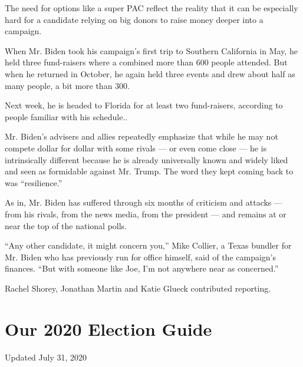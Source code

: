 The need for options like a super PAC reflect the reality that it can be
especially hard for a candidate relying on big donors to raise money
deeper into a campaign.

When Mr. Biden took his campaign's first trip to Southern California in
May, he held three fund-raisers where a combined more than 600 people
attended. But when he returned in October, he again held three events
and drew about half as many people, a bit more than 300.

Next week, he is headed to Florida for at least two fund-raisers,
according to people familiar with his schedule..

Mr. Biden's advisers and allies repeatedly emphasize that while he may
not compete dollar for dollar with some rivals --- or even come close
--- he is intrinsically different because he is already universally
known and widely liked and seen as formidable against Mr. Trump. The
word they kept coming back to was ``resilience.''

As in, Mr. Biden has suffered through six months of criticism and
attacks --- from his rivals, from the news media, from the president ---
and remains at or near the top of the national polls.

``Any other candidate, it might concern you,'' Mike Collier, a Texas
bundler for Mr. Biden who has previously run for office himself, said of
the campaign's finances. ``But with someone like Joe, I'm not anywhere
near as concerned.''

Rachel Shorey, Jonathan Martin and Katie Glueck contributed reporting.

\hypertarget{our-2020-election-guide}{%
\section{Our 2020 Election Guide}\label{our-2020-election-guide}}

Updated July 31, 2020

